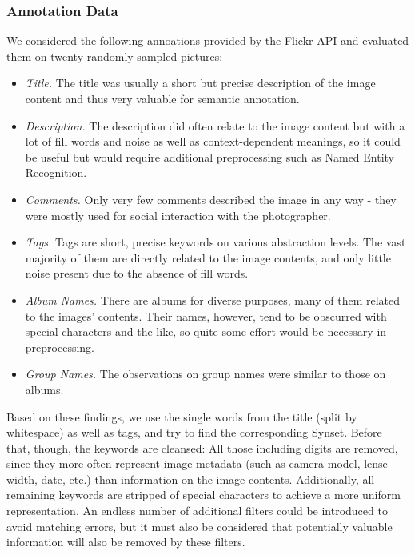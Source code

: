 \subsubsection{Annotation Data}
\label{sec_annotationdata}
We considered the following annoations provided by the Flickr API and evaluated them on twenty randomly sampled pictures:
\begin{itemize}
\item{\emph{Title.}} The title was usually a short but precise description of the image content and thus very valuable for semantic annotation.
\item{\emph{Description.}} The description did often relate to the image content but with a lot of fill words and noise as well as context-dependent meanings, so it could be useful but would require additional preprocessing such as Named Entity Recognition.
\item{\emph{Comments.}} Only very few comments described the image in any way - they were mostly used for social interaction with the photographer.
\item{\emph{Tags.}} Tags are short, precise keywords on various abstraction levels. The vast majority of them are directly related to the image contents, and only little noise present due to the absence of fill words.
\item{\emph{Album Names.}} There are albums for diverse purposes, many of them related to the images' contents. Their names, however, tend to be obscurred with special characters and the like, so quite some effort would be necessary in preprocessing.
\item{\emph{Group Names.}} The observations on group names were similar to those on albums.
\end{itemize}

Based on these findings, we use the single words from the title (split by whitespace) as well as tags, and try to find the corresponding Synset. Before that, though, the keywords are cleansed: All those including digits are removed, since they more often represent image metadata (such as camera model, lense width, date, etc.) than information on the image contents. Additionally, all remaining keywords are stripped of special characters to achieve a more uniform representation. An endless number of additional filters could be introduced to avoid matching errors, but it must also be considered that potentially valuable information will also be removed by these filters.\\

